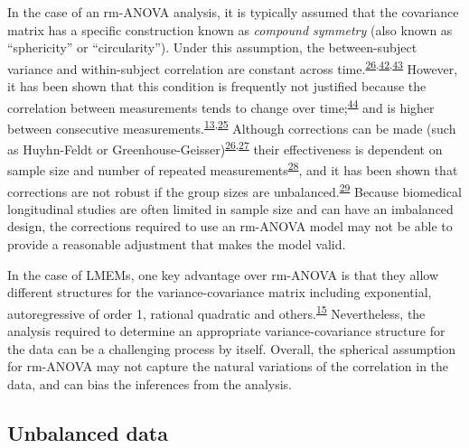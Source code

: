 \documentclass[
]{article}
\begin{document}
In the case of an rm-ANOVA analysis, it is typically assumed that the covariance matrix has a specific construction known as \emph{compound symmetry} (also known as ``sphericity'' or ``circularity''). Under this assumption, the between-subject variance and within-subject correlation are constant across time.\textsuperscript{\protect\hyperlink{ref-huynh1976}{26},\protect\hyperlink{ref-weiss2005}{42},\protect\hyperlink{ref-geisser1958}{43}} However, it has been shown that this condition is frequently not justified because the correlation between measurements tends to change over time;\textsuperscript{\protect\hyperlink{ref-maxwell2017}{44}} and is higher between consecutive measurements.\textsuperscript{\protect\hyperlink{ref-gueorguieva2004}{13},\protect\hyperlink{ref-ugrinowitsch2004}{25}} Although corrections can be made (such as Huyhn-Feldt or Greenhouse-Geisser)\textsuperscript{\protect\hyperlink{ref-huynh1976}{26},\protect\hyperlink{ref-greenhouse1959}{27}} their effectiveness is dependent on sample size and number of repeated measurements\textsuperscript{\protect\hyperlink{ref-haverkamp2017}{28}}, and it has been shown that corrections are not robust if the group sizes are unbalanced.\textsuperscript{\protect\hyperlink{ref-keselman2001}{29}} Because biomedical longitudinal studies are often limited in sample size and can have an imbalanced design, the corrections required to use an rm-ANOVA model may not be able to provide a reasonable adjustment that makes the model valid.

In the case of LMEMs, one key advantage over rm-ANOVA is that they allow different structures for the variance-covariance matrix including exponential, autoregressive of order 1, rational quadratic and others.\textsuperscript{\protect\hyperlink{ref-pinheiro2006}{15}} Nevertheless, the analysis required to determine an appropriate variance-covariance structure for the data can be a challenging process by itself. Overall, the spherical assumption for rm-ANOVA may not capture the natural variations of the correlation in the data, and can bias the inferences from the analysis.

\hypertarget{unbalanced-data}{%
\subsection{Unbalanced data}\label{unbalanced-data}}
\end{document}
